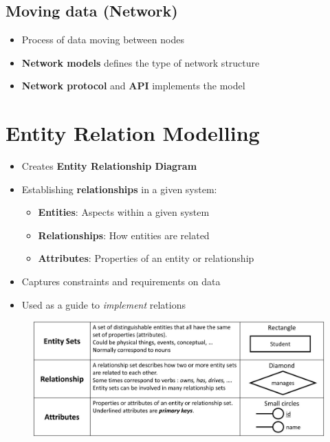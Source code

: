 \documentclass[conference]{IEEEtran}
\begin{document}
\subsection{Moving data (Network)}

\begin{itemize}
    \item Process of data moving between nodes
    \item \textbf{Network models} defines the type of network structure
    \item \textbf{Network protocol} and \textbf{API} implements the model
\end{itemize}

\section{Entity Relation Modelling}
\begin{itemize}
    \item Creates \textbf{Entity Relationship Diagram}
    \item Establishing \textbf{relationships} in a given system:
    \begin{itemize}
        \item \textbf{Entities}: Aspects within a given system
        \item \textbf{Relationships}: How entities are related
        \item \textbf{Attributes}: Properties of an entity or relationship
    \end{itemize}
    \item Captures constraints and requirements on data 
    \item Used as a guide to \textit{implement} relations
\end{itemize}
\begin{figure} [h!]
    \centering
    \includegraphics[scale=0.3]{ERM.JPG}
\end{figure}
\end{document}
